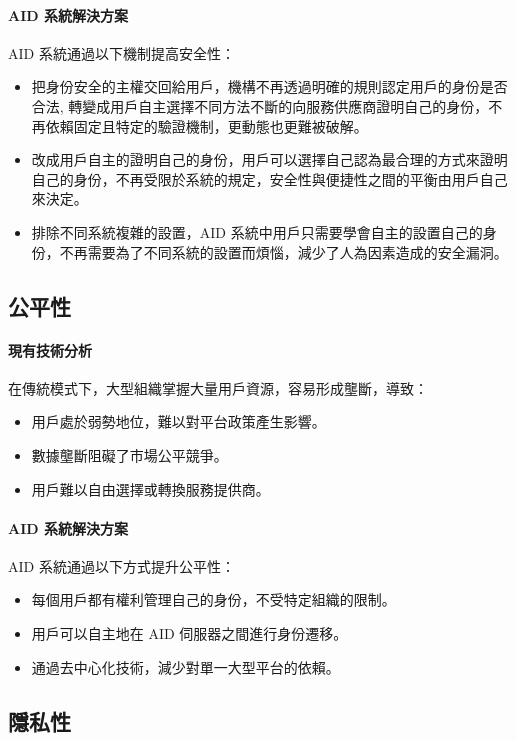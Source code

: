 \paragraph{AID 系統解決方案}
AID 系統通過以下機制提高安全性：
\begin{itemize}
  \item 把身份安全的主權交回給用戶，機構不再透過明確的規則認定用戶的身份是否合法, 轉變成用戶自主選擇不同方法不斷的向服務供應商證明自己的身份，不再依賴固定且特定的驗證機制，更動態也更難被破解。
  \item 改成用戶自主的證明自己的身份，用戶可以選擇自己認為最合理的方式來證明自己的身份，不再受限於系統的規定，安全性與便捷性之間的平衡由用戶自己來決定。
  \item 排除不同系統複雜的設置，AID 系統中用戶只需要學會自主的設置自己的身份，不再需要為了不同系統的設置而煩惱，減少了人為因素造成的安全漏洞。
\end{itemize}

\subsection{公平性}

\paragraph{現有技術分析}
在傳統模式下，大型組織掌握大量用戶資源，容易形成壟斷，導致：
\begin{itemize}
  \item 用戶處於弱勢地位，難以對平台政策產生影響。
  \item 數據壟斷阻礙了市場公平競爭。
  \item 用戶難以自由選擇或轉換服務提供商。
\end{itemize}

\paragraph{AID 系統解決方案}
AID 系統通過以下方式提升公平性：
\begin{itemize}
  \item 每個用戶都有權利管理自己的身份，不受特定組織的限制。
  \item 用戶可以自主地在 AID 伺服器之間進行身份遷移。
  \item 通過去中心化技術，減少對單一大型平台的依賴。
\end{itemize}

\subsection{隱私性}

